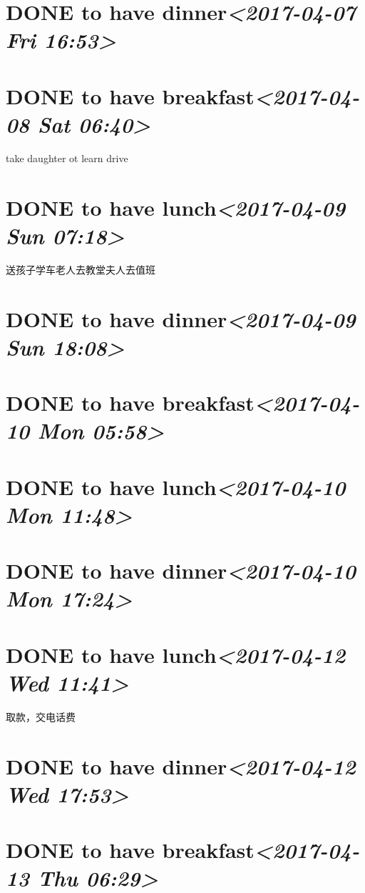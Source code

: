\documentclass[cyan]{elegantnote}
\begin{document}
\section{{\bfseries\sffamily DONE} to have dinner\textit{<2017-04-07 Fri 16:53>}}
\label{sec:orgd0fcaf0}
\section{{\bfseries\sffamily DONE} to have breakfast\textit{<2017-04-08 Sat 06:40>}}
\label{sec:org8bd6e39}
take daughter ot learn drive
\section{{\bfseries\sffamily DONE} to have lunch\textit{<2017-04-09 Sun 07:18>}}
\label{sec:org0eb3233}
送孩子学车老人去教堂夫人去值班
\section{{\bfseries\sffamily DONE} to have dinner\textit{<2017-04-09 Sun 18:08>}}
\label{sec:orgee0f229}
\section{{\bfseries\sffamily DONE} to have breakfast\textit{<2017-04-10 Mon 05:58>}}
\label{sec:org41a423d}
\section{{\bfseries\sffamily DONE} to have lunch\textit{<2017-04-10 Mon 11:48>}}
\label{sec:org322d3cc}
\section{{\bfseries\sffamily DONE} to have dinner\textit{<2017-04-10 Mon 17:24>}}
\label{sec:org3b6d824}
\section{{\bfseries\sffamily DONE} to have lunch\textit{<2017-04-12 Wed 11:41>}}
\label{sec:orgcbab49f}
取款，交电话费
\section{{\bfseries\sffamily DONE} to have dinner\textit{<2017-04-12 Wed 17:53>}}
\label{sec:org420a89d}
\section{{\bfseries\sffamily DONE} to have breakfast\textit{<2017-04-13 Thu 06:29>}}
\label{sec:orgf463226}
\end{document}

